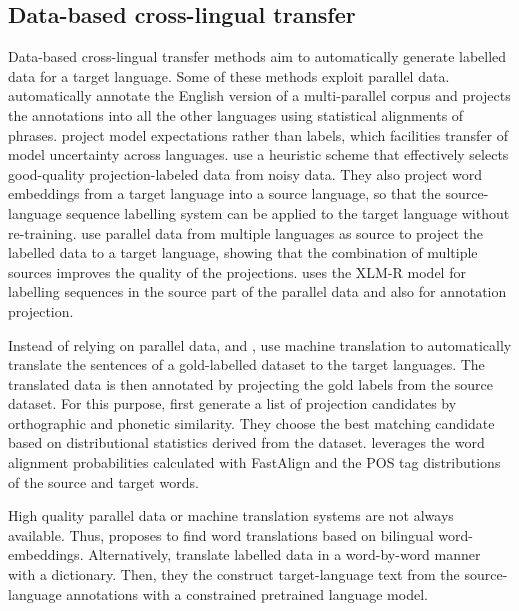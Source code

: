 \documentclass[11pt]{article}
\begin{document}
\subsection{Data-based cross-lingual transfer}

Data-based cross-lingual transfer methods aim to automatically generate labelled data for a target language. Some of these methods exploit parallel data. \citet{Ehrmann} automatically annotate the English version of a multi-parallel corpus and projects the annotations into all the other languages using statistical alignments of phrases. \citet{wang-manning-2014-cross} project model expectations rather than labels, which facilities transfer of model uncertainty across languages. \citet{ni-etal-2017-weakly} use a heuristic scheme that effectively selects good-quality projection-labeled data from noisy data. They also project word embeddings from a target language into a source language, so that the source-language sequence labelling system can be applied to the target language without re-training. \citet{agerri-etal-2018-building} use parallel data from multiple languages as source to project the labelled data to a target language, showing that the combination of multiple sources improves the quality of the projections. \citet{Li2021crosslingualNE} uses the XLM-R model \cite{xlmr} for labelling sequences in the source part of the parallel data and also for annotation projection. 

Instead of relying on parallel data, \citet{jain-etal-2019-entity} and \citet{fei-etal-2020-cross}, use machine translation to automatically translate the sentences of a gold-labelled dataset to the target languages. The translated data is then annotated by projecting the gold labels from the source dataset. For this purpose, \citet{jain-etal-2019-entity} first generate a list of projection candidates by orthographic and phonetic similarity. They choose the best matching candidate based on distributional statistics derived from the dataset. \citet{fei-etal-2020-cross} leverages the word alignment probabilities calculated with FastAlign \cite{fastalign} and the POS tag distributions of the source and target words. 

High quality parallel data or machine translation systems are not always available. Thus, \citet{xie-etal-2018-neural} proposes to find word translations based on bilingual word-embeddings. Alternatively, \citet{guo-roth-2021-constrained} translate labelled data in a word-by-word manner with a dictionary. Then, they the construct target-language text from the source-language annotations with a constrained pretrained language model.
\end{document}
